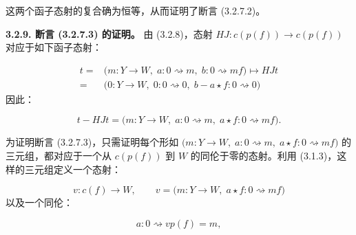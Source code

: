 这两个函子态射的复合确为恒等，从而证明了断言 (3.2.7.2)。

\noindent\textbf{3.2.9. 断言 (3.2.7.3) 的证明。}\quad
{}
由 (3.2.8)，态射
$HJ\colon c(p(f))\longrightarrow c(p(f))$ 对应于如下函子态射：

\begin{equation}
  \begin{aligned}
    t={}&\bigl(m\colon Y\longrightarrow W,\;
      a\colon0\rightsquigarrow m,\;
      b\colon0\rightsquigarrow mf\bigr)
      \longmapsto HJt\\
    ={}&\bigl(0\colon Y\longrightarrow W,\;
      0\colon0\rightsquigarrow0,\;
      b-a\star f\colon0\rightsquigarrow0\bigr)
  \end{aligned}
  \tag{3.2.9.1}
\end{equation}
因此：

\begin{equation}
  t-HJt=\bigl(m\colon Y\longrightarrow W,\;
    a\colon0\rightsquigarrow m,\;
    a\star f\colon0\rightsquigarrow mf\bigr).
  \tag{3.2.9.2}
\end{equation}

为证明断言 (3.2.7.3)，只需证明每个形如
$\bigl(m\colon Y\longrightarrow W,\;a\colon0\rightsquigarrow m,\;
a\star f\colon0\rightsquigarrow mf\bigr)$ 的三元组，都对应于一个从
$c(p(f))$ 到 $W$ 的同伦于零的态射。利用 (3.1.3)，这样的三元组定义一个态射：

\begin{equation}
  v\colon c(f)\longrightarrow W,
  \qquad
  v=\bigl(m\colon Y\longrightarrow W,\;
    a\star f\colon0\rightsquigarrow mf\bigr)
  \tag{3.2.9.3}
\end{equation}
以及一个同伦：

\begin{equation}
  a\colon0\rightsquigarrow vp(f)=m,
  \tag{3.2.9.4}
\end{equation}
